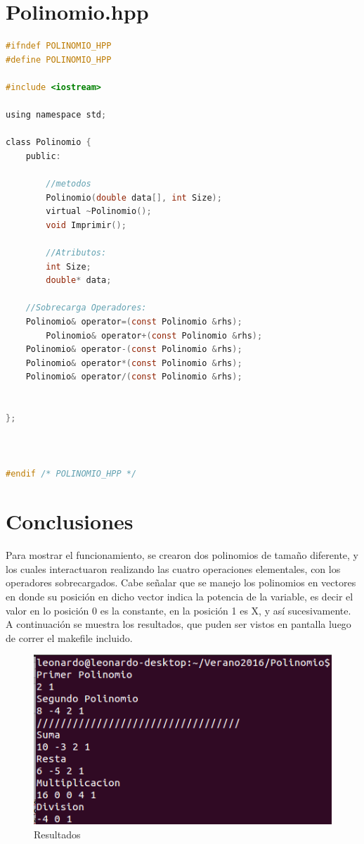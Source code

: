 \documentclass[11pt]{article}
\begin{document}
\section{Polinomio.hpp}
\begin{lstlisting}[language=C]
#ifndef POLINOMIO_HPP
#define POLINOMIO_HPP

#include <iostream>

using namespace std;

class Polinomio {
	public:
		
		//metodos
		Polinomio(double data[], int Size);
		virtual ~Polinomio();
		void Imprimir();

		//Atributos:
		int Size; 
		double* data;

	//Sobrecarga Operadores:
	Polinomio& operator=(const Polinomio &rhs);
        Polinomio& operator+(const Polinomio &rhs);
	Polinomio& operator-(const Polinomio &rhs);
	Polinomio& operator*(const Polinomio &rhs);
	Polinomio& operator/(const Polinomio &rhs);
     
	
};



#endif /* POLINOMIO_HPP */


\end{lstlisting}

\section{Conclusiones}
Para mostrar el funcionamiento, se crearon dos polinomios de tamaño diferente, y los cuales interactuaron realizando las cuatro operaciones elementales, con los operadores sobrecargados. Cabe señalar que se manejo los polinomios en vectores en donde su posici\'on en dicho vector indica la potencia de la variable, es decir el valor en lo posici\'on 0 es la constante, en la posici\'on 1 es X, y así sucesivamente.
A continuaci\'on se muestra los resultados, que puden ser vistos en pantalla luego de correr el makefile incluido. 

\begin{figure}[ht]
\centering
\includegraphics[scale=0.4]{ressss.png}
\caption{Resultados}
\end{figure}
\end{document}
